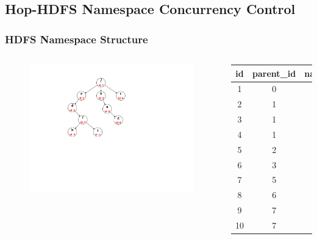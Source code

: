 \documentclass{beamer}
\begin{document}
\subsection{Hop-HDFS Namespace Concurrency Control}
\begin{frame}
	\frametitle{HDFS Namespace Structure}
	\begin{columns}[c] %
	
		\begin{figure}[h]
			\centering
			\includegraphics[scale=0.6]{figs/hoptree.pdf}
		\end{figure}
	
	\begin{table}[h]
		\centering
		\begin{tabular}{|c|c|c|}
			\hline
			\textbf{id} & \textbf{parent\_id} & \textbf{name}\\ \hline
			1 & 0 & / \\ \hline
			2 & 1 & a \\ \hline
			3 & 1 & b \\ \hline
			4 & 1 & c \\ \hline
			5 & 2 & d \\ \hline
			6 & 3 & e \\ \hline
			7 & 5 & f \\ \hline
			8 & 6 & g \\ \hline
			9 & 7 & h \\ \hline
			10 & 7 & i \\ \hline
		\end{tabular}
	\end{table}
	
	\end{columns}
\end{frame}
\end{document}
